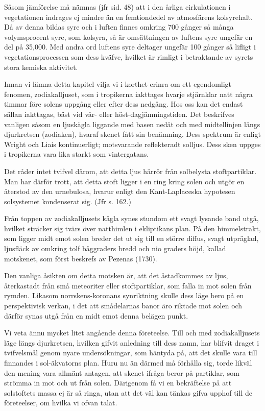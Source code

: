 \documentclass[a4paper, 12pt, oneside, swedish]{article}
\begin{document}
Såsom jämförelse må nämnas (jfr sid. 48) att i den årliga cirkulationen i vegetationen indrages ej mindre än en femtiondedel av atmosfärens kolsyrehalt. Då av denna bildas syre och i luften finnes omkring 700 gånger så många volymsprocent syre, som kolsyra, så är omsättningen av luftens syre ungefär en del på 35,000. Med andra ord luftens syre deltager ungefär 100 gånger så lifligt i vegetationsprocessen som dess kväfve, hvilket är rimligt i betraktande av syrets stora kemiska aktivitet.

Innan vi lämna detta kapitel vilja vi i korthet erinra om ett egendomligt fenomen, zodiakalljuset, som i tropikerna iakttages hvarje stjärnklar natt några timmar före solens uppgång eller efter dess nedgång. Hos oss kan det endast sällan iakttagas, bäst vid vår- eller höst-dagjämningstiden. Det beskrifves vanligen såsom en ljuskägla liggande med basen nedåt och med midtellinjen längs djurkretsen (zodiaken), hvaraf skenet fått sin benämning. Dess spektrum är enligt Wright och Liais kontinuerligt; motsvarande reflekteradt solljus. Dess sken uppges i tropikerna vara lika starkt som vintergatans.

Det råder intet tvifvel därom, att detta ljus härrör från solbelysta stoftpartiklar. Man har därför trott, att detta stoft ligger i en ring kring solen och utgör en återstod av den urnebulosa, hvarur enligt den Kant-Laplaceska hypotesen solsystemet kondenserat sig. (Jfr s. 162.)

Från toppen av zodiakalljusets kägla synes stundom ett svagt lysande band utgå, hvilket sträcker sig tvärs över natthimlen i ekliptikans plan. På den himmelstrakt, som ligger midt emot solen breder det ut sig till en större diffus, svagt utpräglad, ljusfläck av omkring tolf båggraders bredd och nio graders höjd, kallad motskenet, som först beskrefs av Pezenas (1730).

Den vanliga åsikten om detta motsken är, att det åstadkommes av ljus, återkastadt från små meteoriter eller stoftpartiklar, som falla in mot solen från rymden. Likasom norrskens-koronans synriktning skulle dess läge bero på en perspektivisk verkan, i det att smådelarnas banor äro riktade mot solen och därför synas utgå från en midt emot denna belägen punkt.

Vi veta ännu mycket litet angående denna företeelse. Till och med zodiakalljusets läge längs djurkretsen, hvilken gifvit anledning till dess namn, har blifvit draget i tvifvelsmål genom nyare undersökningar, som häntyda på, att det skulle vara till finnandes i sol-äkvatorns plan. Huru nu än därmed må förhålla sig, torde likväl den mening vara allmänt antagen, att skenet ifråga beror på partiklar, som strömma in mot och ut från solen. Därigenom få vi en bekräftelse på att solstoftets massa ej är så ringa, utan att det väl kan tänkas gifva upphof till de företeelser, om hvilka vi ofvan talat.
\clearpage
\end{document}
